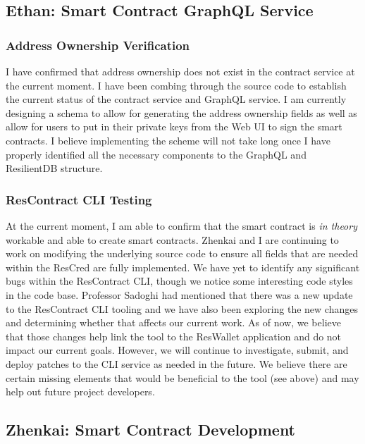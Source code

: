\subsection{Ethan: Smart Contract GraphQL Service}
\subsubsection{Address Ownership Verification}

I have confirmed that address ownership does not exist in the contract service at the current moment. I have been combing through the source code to establish the current status of the contract service and GraphQL service. I am currently designing a schema to allow for generating the address ownership fields as well as allow for users to put in their private keys from the Web UI to sign the smart contracts. I believe implementing the scheme will not take long once I have properly identified all the necessary components to the GraphQL and ResilientDB structure. 

\subsubsection{ResContract CLI Testing}

At the current moment, I am able to confirm that the smart contract is \textit{in theory} workable and able to create smart contracts. Zhenkai and I are continuing to work on modifying the underlying source code to ensure all fields that are needed within the ResCred are fully implemented. We have yet to identify any significant bugs within the ResContract CLI, though we notice some interesting code styles in the code base. Professor Sadoghi had mentioned that there was a new update to the ResContract CLI tooling and we have also been exploring the new changes and determining whether that affects our current work. As of now, we believe that those changes help link the tool to the ResWallet application and do not impact our current goals. However, we will continue to investigate, submit, and deploy patches to the CLI service as needed in the future. We believe there are certain missing elements that would be beneficial to the tool (see above) and may help out future project developers.

\subsection{Zhenkai: Smart Contract Development}
